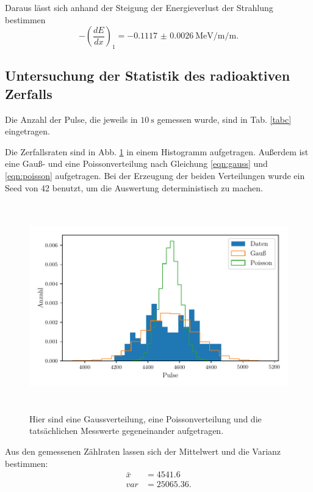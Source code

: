 \noindent Daraus lässt sich anhand der Steigung der Energieverlust der Strahlung bestimmen %
\begin{equation*}
    - \left( \frac{dE}{dx} \right)_1 = - \SI{0.1117(26)}{\mega\electronvolt\per\milli\per\meter}.
\end{equation*}

\subsection{Untersuchung der Statistik des radioaktiven Zerfalls}

Die Anzahl der Pulse, die jeweils in $\SI{10}{\second}$ gemessen wurde, sind in Tab. \ref{tabc} eingetragen.



Die Zerfallsraten sind in Abb. \ref{fig:histogramm} in einem Histogramm aufgetragen. Außerdem ist eine Gauß- und eine Poissonverteilung nach Gleichung \eqref{eqn:gauss} und \eqref{eqn:poisson} aufgetragen. Bei der Erzeugung der beiden Verteilungen wurde ein Seed von 42 benutzt, um die Auswertung deterministisch zu machen. 
\begin{figure}
    \centering
    \includegraphics[width=12cm, height=9cm]{build/plote.pdf}
    \caption{Hier sind eine Gaussverteilung, eine Poissonverteilung und die tatsächlichen Messwerte gegeneinander aufgetragen.}
    \label{fig:histogramm}
\end{figure}

\noindent Aus den gemessenen Zählraten lassen sich der  Mittelwert und die Varianz bestimmen: %
\begin{align*}
    \bar{x} &= \num{4541.6} \\
    var &= \num{25065.36}.
\end{align*}

